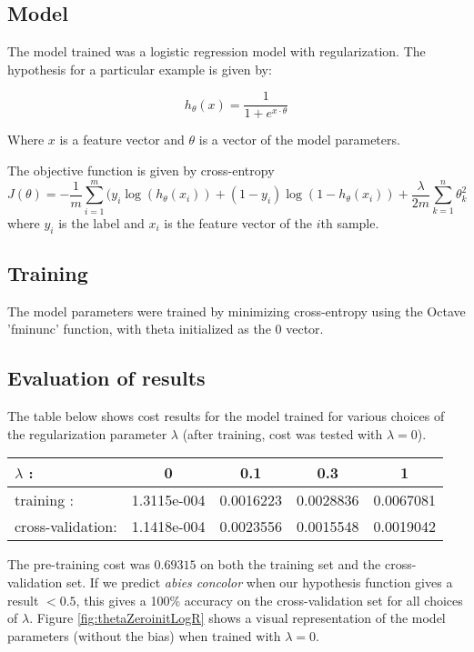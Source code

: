 \documentclass[12pt]{article}
\DeclareMathOperator{\Log}{log}
\newcommand*{\octfont}{\fontfamily{cmvtt}\selectfont}
\begin{document}
\subsection{Model} The model trained was a logistic regression model with regularization. The hypothesis for a particular example is given by:

\[
h_\theta(x) = \frac{1}{1+e^{x \cdot \theta}}
\]

Where $x$ is a feature vector and $\theta$ is a vector of the  model parameters.

The objective function is given by cross-entropy
\[
 J(\theta) = -\frac{1}{m}\sum_{i = 1}^m (y_i\Log(h_\theta(x_i))+(1-y_i)\Log(1-h_\theta(x_i)) + \frac{\lambda}{2m} \sum_{k=1}^n \theta_k^2
\]
where $y_i$ is the label and $x_i$ is the feature vector of the $i$th sample.

\subsection{Training} The model parameters were trained by minimizing cross-entropy using the Octave '{\octfont fminunc}' function, with theta initialized as the $0$ vector.

\subsection{Evaluation of results} The table below shows cost results for the model trained for various choices of the regularization parameter $\lambda$ (after training, cost was tested with $\lambda = 0$).

\begin{center}
\begin{tabular}{|l|c|c|c|c|}
 \hline
 $\lambda$ : & 0 & 0.1 & 0.3 & 1\\
 \hline
 training : & 1.3115e-004 & 0.0016223 & 0.0028836 & 0.0067081\\
 cross-validation: & 1.1418e-004 & 0.0023556 & 0.0015548 & 0.0019042 \\
 \hline
\end{tabular}
\end{center}

The pre-training cost was $0.69315$ on both the training set and the cross-validation set. If we predict \textit{abies concolor} when our hypothesis function gives a result $<0.5$, this gives a 100\% accuracy on the cross-validation set for all choices of $\lambda$. Figure \ref{fig:thetaZeroinitLogR} shows a visual representation of the model parameters (without the bias) when trained with $\lambda = 0$. 
\end{document}
